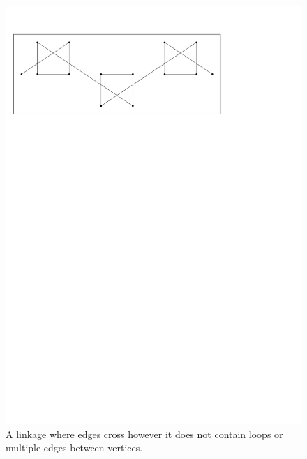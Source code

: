 \begin{figure}[h]
\begin{center}
\includegraphics[scale=1]{graphics/crossingEdgeLinkage.pdf}
\end{center} 
\caption{A linkage where edges cross however it does not contain loops or multiple edges between 
vertices.}
\label{fig:linkage-3}
\end{figure}
